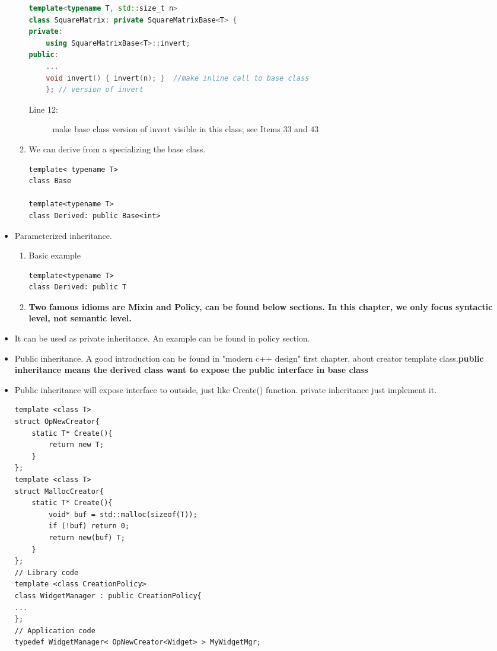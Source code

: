 \documentclass[a4paper,11pt,twoside]{book}
\begin{document}
\begin{itemize}
\begin{enumerate}
\begin{lstlisting}[frame=single, language=c++]
template<typename T, std::size_t n>
class SquareMatrix: private SquareMatrixBase<T> {
private:
	using SquareMatrixBase<T>::invert; 
public:
	...
	void invert() { invert(n); }  //make inline call to base class
	}; // version of invert
\end{lstlisting}
\begin{description}
	\item[Line 12:] make base class version of invert visible in this class; see Items 33 and 43
\end{description}

	
	\item We can derive from a specializing the base class.
\begin{lstlisting}[numbers=none]
template< typename T>
class Base
	
template<typename T>
class Derived: public Base<int>
\end{lstlisting}
\end{enumerate}

\item Parameterized inheritance.
	\begin{enumerate}
	\item Basic example 
\begin{lstlisting}[numbers=none]
template<typename T>
class Derived: public T
\end{lstlisting}
	
	\item \textbf{Two famous idioms are Mixin and Policy, can be found below sections. In this chapter, we only focus syntactic level, not semantic level.}

	\end{enumerate}

\item It can be used as private inheritance. An example can be found in policy section. 

\item Public inheritance. A good introduction can be found in "modern c++ design" first chapter, about creator template class.\textbf{public inheritance means the derived class want to expose the public interface in base class}

\item Public inheritance will expose interface to outside, just like Create() function. private inheritance just implement it. 

\begin{lstlisting}[numbers=none]
template <class T>
struct OpNewCreator{
	static T* Create(){
		return new T;
	}
};
template <class T>
struct MallocCreator{
	static T* Create(){
		void* buf = std::malloc(sizeof(T));
		if (!buf) return 0;
		return new(buf) T;
	}
}; 
// Library code
template <class CreationPolicy>
class WidgetManager : public CreationPolicy{
...
}; 
// Application code
typedef WidgetManager< OpNewCreator<Widget> > MyWidgetMgr; 
\end{lstlisting}


\end{itemize}
\end{document}
